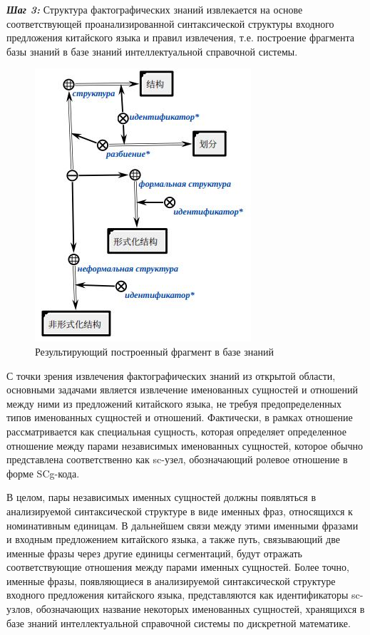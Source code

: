 \textbf{\textit{Шаг 3:}} Структура фактографических знаний извлекается на основе соответствующей проанализированной синтаксической структуры входного предложения китайского языка и правил извлечения, т.е. построение фрагмента базы знаний в базе знаний интеллектуальной справочной системы.


\begin{figure}[H]
	\centering
	\includegraphics[scale=0.7]{images/part4/chapter_chinese/generated_sc_structure.png}
	\caption{Результирующий построенный фрагмент в базе знаний}
	\label{fig:generated-structure}
\end{figure}

С точки зрения извлечения фактографических знаний из открытой области, основными задачами является извлечение именованных сущностей и отношений между ними из предложений китайского языка, не требуя предопределенных типов именованных сущностей и отношений. Фактически, в рамках  отношение рассматривается как специальная сущность, которая определяет определенное отношение между парами независимых именованных сущностей, которое обычно представлена соответственно как sc-узел, обозначающий ролевое отношение в форме SCg-кода.

В целом, пары независимых именных сущностей должны появляться в анализируемой синтаксической структуре в виде именных фраз, относящихся к номинативным единицам. В дальнейшем связи между этими именными фразами и входным предложением китайского языка, а также путь, связывающий две именные фразы через другие единицы сегментаций, будут отражать соответствующие отношения между парами именных сущностей. Более точно, именные фразы, появляющиеся в анализируемой синтаксической структуре входного предложения китайского языка, представляются как идентификаторы sc-узлов, обозначающих название некоторых именованных сущностей, хранящихся в базе знаний интеллектуальной справочной системы по дискретной математике.

